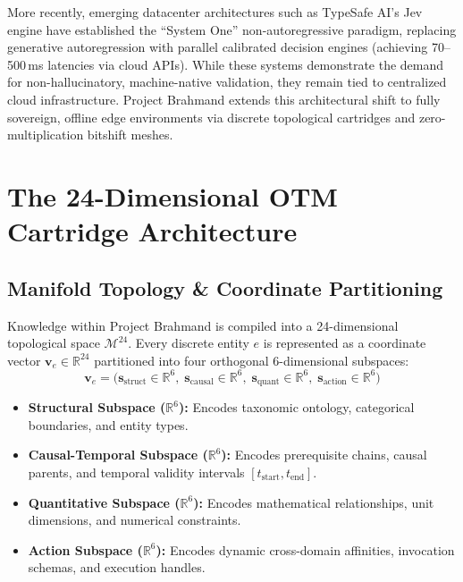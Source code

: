 \documentclass[11pt,a4paper]{article}
\theoremstyle{definition}
\begin{document}
More recently, emerging datacenter architectures such as TypeSafe AI's Jev engine have established the ``System One'' non-autoregressive paradigm, replacing generative autoregression with parallel calibrated decision engines (achieving 70--500\,ms latencies via cloud APIs). While these systems demonstrate the demand for non-hallucinatory, machine-native validation, they remain tied to centralized cloud infrastructure. Project Brahmand extends this architectural shift to fully sovereign, offline edge environments via discrete topological cartridges and zero-multiplication bitshift meshes.

\section{The 24-Dimensional OTM Cartridge Architecture}

\subsection{Manifold Topology \& Coordinate Partitioning}
Knowledge within Project Brahmand is compiled into a 24-dimensional topological space $\mathcal{M}^{24}$. Every discrete entity $e$ is represented as a coordinate vector $\mathbf{v}_e \in \mathbb{R}^{24}$ partitioned into four orthogonal 6-dimensional subspaces:
\begin{equation}
\mathbf{v}_e = \big( \mathbf{s}_{\text{struct}} \in \mathbb{R}^6, \; \mathbf{s}_{\text{causal}} \in \mathbb{R}^6, \; \mathbf{s}_{\text{quant}} \in \mathbb{R}^6, \; \mathbf{s}_{\text{action}} \in \mathbb{R}^6 \big)
\end{equation}

\begin{itemize}
    \item \textbf{Structural Subspace ($\mathbb{R}^6$):} Encodes taxonomic ontology, categorical boundaries, and entity types.
    \item \textbf{Causal-Temporal Subspace ($\mathbb{R}^6$):} Encodes prerequisite chains, causal parents, and temporal validity intervals $[t_{\text{start}}, t_{\text{end}}]$.
    \item \textbf{Quantitative Subspace ($\mathbb{R}^6$):} Encodes mathematical relationships, unit dimensions, and numerical constraints.
    \item \textbf{Action Subspace ($\mathbb{R}^6$):} Encodes dynamic cross-domain affinities, invocation schemas, and execution handles.
\end{itemize}
\end{document}
